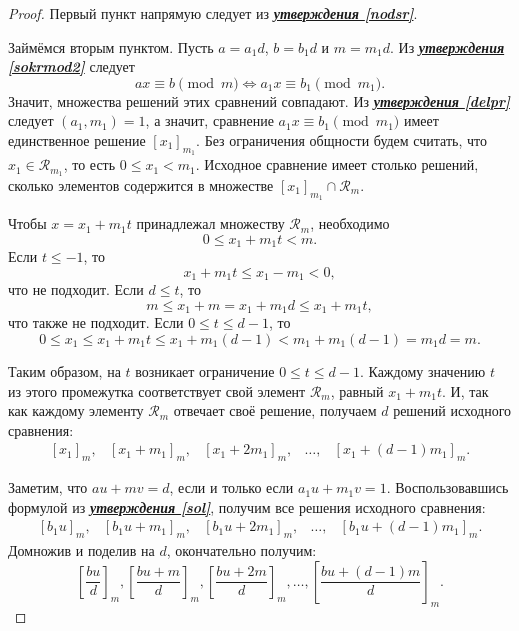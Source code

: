 \documentclass[14pt, a4paper]{extarticle}
\theoremstyle{definition}
\begin{document}
	\begin{proof}
		Первый пункт напрямую следует из \hyperref[nodsr]{\textbf{\textit{утверждения \ref*{nodsr}}}}.
		
		Займёмся вторым пунктом. Пусть $a=a_1d$, $b=b_1d$ и $m=m_1d$. Из \hyperref[sokrmod2]{\textbf{\textit{утверждения \ref*{sokrmod2}}}} следует
		$$\boxed{ax\equiv b\pmod{m}\Leftrightarrow a_1x\equiv b_1\pmod{m_1}}.$$
		Значит, множества решений этих сравнений совпадают. Из \hyperref[delpr]{\textbf{\textit{утверждения \ref*{delpr}}}} следует $(a_1,m_1)=1$, а значит, сравнение $a_1x\equiv b_1\pmod{m_1}$ имеет единственное решение $[x_1]_{m_1}$. Без ограничения общности будем считать, что $x_1\in\mathcal{R}_{m_1}$, то есть $0\leqslant x_1<m_1$. Исходное сравнение имеет столько решений, сколько элементов содержится в множестве $[x_1]_{m_1}\cap\mathcal{R}_m$.
		
		Чтобы $x=x_1+m_1t$ принадлежал множеству $\mathcal{R}_m$, необходимо $$0\leqslant x_1+m_1t<m.$$ Если $t\leqslant-1$, то $$x_1+m_1t\leqslant x_1-m_1<0,$$ что не подходит. Если $d\leqslant t$, то $$m\leqslant x_1+m=x_1+m_1d\leqslant x_1+m_1t,$$ что также не подходит. Если $0\leqslant t\leqslant d-1$, то
		$$\boxed{0\leqslant}x_1\leqslant\boxed{x_1+m_1t}\leqslant x_1+m_1(d-1)\boxed{<}m_1+m_1(d-1)=m_1d=\boxed{m}.$$
		
		Таким образом, на $t$ возникает ограничение $0\leqslant t\leqslant d-1$. Каждому значению $t$ из этого промежутка соответствует свой элемент $\mathcal{R}_m$, равный $x_1+m_1t$. И, так как каждому элементу $\mathcal{R}_m$ отвечает своё решение, получаем $d$ решений исходного сравнения:
		$$\begin{array}{ccccc}
			[x_1]_m,&[x_1+m_1]_m,&[x_1+2m_1]_m,&\dots,&[x_1+(d-1)m_1]_m.
		\end{array}$$
		
		Заметим, что $au+mv=d$, если и только если \mbox{$a_1u+m_1v=1$}. Воспользовавшись формулой из \hyperref[sol]{\textbf{\textit{утверждения \ref*{sol}}}}, получим все решения исходного сравнения:
		$$\begin{array}{ccccc}
			[b_1u]_m,&[b_1u+m_1]_m,&[b_1u+2m_1]_m,&\dots,&[b_1u+(d-1)m_1]_m.
		\end{array}$$
		Домножив и поделив на $d$, окончательно получим:
		$$\left[\frac{bu}{d}\right]_m, \left[\frac{bu+m}{d}\right]_m, \left[\frac{bu+2m}{d}\right]_m, \dots, \left[\frac{bu+(d-1)m}{d}\right]_m.$$
	\end{proof}
\end{document}
